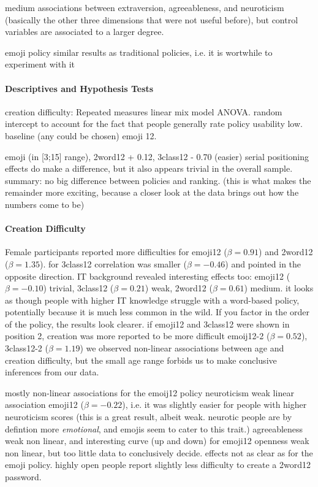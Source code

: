 medium associations between extraversion, agreeableness, and neuroticism (basically the other three dimensions that were not useful before), but control variables are associated to a larger degree.

emoji policy similar results as traditional policies, i.e. it is wortwhile to experiment with it

\paragraph{Descriptives and Hypothesis Tests}
creation difficulty: Repeated measures linear mix model ANOVA. random intercept to account for the fact that people generally rate policy usability low. baseline (any could be chosen) emoji 12.

emoji  (in [3;15] range), 2word12 + 0.12, 3class12 - 0.70 (easier)
serial positioning effects do make a difference, but it also appears trivial in the overall sample.
summary: no big difference between policies and ranking. (this is what makes the remainder more exciting, because a closer look at the data brings out how the numbers come to be)


\paragraph{Creation Difficulty}
Female participants reported more difficulties for emoji12 ($\beta=0.91$) and 2word12 ($\beta=1.35$). 
for 3class12 correlation was smaller ($\beta=-0.46$) and pointed in the opposite direction.
IT background revealed interesting effects too: emoji12 ($\beta=-0.10$) trivial, 3class12 ($\beta=0.21$) weak, 2word12 ($\beta=0.61$) medium. it looks as though people with higher IT knowledge struggle with a word-based policy, potentially because it is much less common in the wild. 
If you factor in the order of the policy, the results look clearer. if emoji12 and 3class12 were shown in position 2, creation was more reported to be more difficult emoij12-2 ($\beta=0.52$), 3class12-2 ($\beta=1.19$) 
we observed non-linear associations between age and creation difficulty, but the small age range forbids us to make conclusive inferences from our data.

mostly non-linear associations for the emoij12 policy
neuroticism weak linear association emoji12 ($\beta=-0.22$), i.e. it was slightly easier for people with higher neuroticism scores (this is a great result, albeit weak. neurotic people are by defintion more \textit{emotional}, and emojis seem to cater to this trait.)
agreeableness weak non linear, and interesting curve (up and down) for emoji12
openness weak non linear, but too little data to conclusively decide. 
effects not as clear as for the emoji policy. highly open people report slightly less difficulty to create a 2word12 password.


